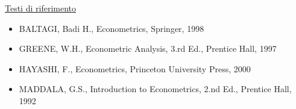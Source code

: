 \documentclass[a4paper,12pt]{article}
\begin{document}
\vspace{1.5cm}

\underline{Testi di riferimento}

\begin{itemize}
\item BALTAGI, Badi H., Econometrics, Springer, 1998

\item GREENE, W.H., Econometric Analysis, 3.rd Ed., Prentice Hall, 1997

\item HAYASHI, F., Econometrics, Princeton University Press, 2000

\item MADDALA, G.S., Introduction to Econometrics, 2.nd Ed., Prentice Hall,
1992
\end{itemize}
\end{document}
